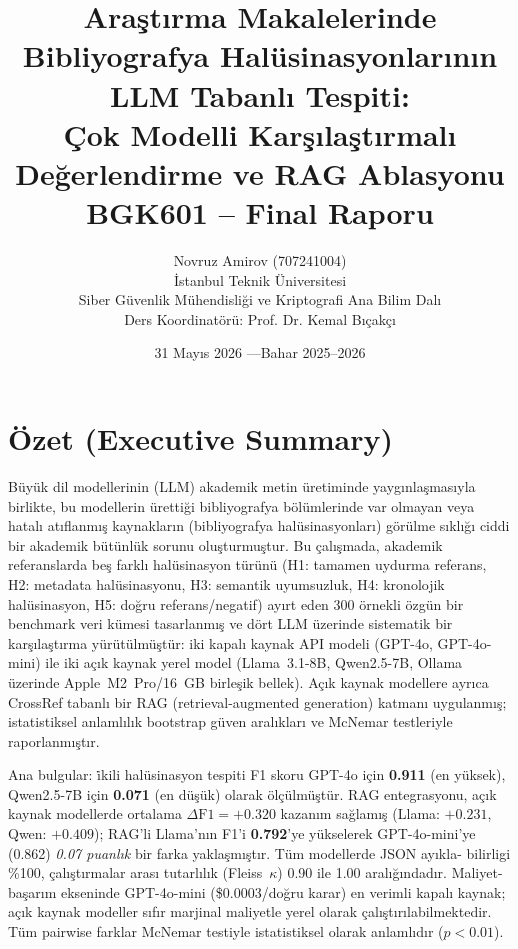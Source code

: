\documentclass[11pt,a4paper]{article}
\title{\textbf{Araştırma Makalelerinde Bibliyografya
       Halüsinasyonlarının LLM Tabanlı Tespiti:\\
       Çok Modelli Karşılaştırmalı Değerlendirme ve RAG Ablasyonu}\\[0.6em]
       \large BGK601 -- Final Raporu}
\author{Novruz Amirov (707241004)\\
        İstanbul Teknik Üniversitesi\\
        Siber Güvenlik Mühendisliği ve Kriptografi Ana Bilim Dalı\\
        Ders Koordinatörü: Prof. Dr. Kemal Bıçakçı}
\date{31 Mayıs 2026 \quad ---\quad Bahar 2025--2026}
\begin{document}
\maketitle
\thispagestyle{empty}

\begin{center}\small
{}
\end{center}

\section*{Özet (Executive Summary)}
Büyük dil modellerinin (LLM) akademik metin üretiminde yaygınlaşmasıyla
birlikte, bu modellerin ürettiği bibliyografya bölümlerinde var olmayan veya
hatalı atıflanmış kaynakların (bibliyografya halüsinasyonları) görülme sıklığı
ciddi bir akademik bütünlük sorunu oluşturmuştur. Bu çalışmada, akademik
referanslarda beş farklı halüsinasyon türünü (H1: tamamen uydurma referans,
H2: metadata halüsinasyonu, H3: semantik uyumsuzluk, H4: kronolojik
halüsinasyon, H5: doğru referans/negatif) ayırt eden 300 örnekli özgün bir
benchmark veri kümesi tasarlanmış ve dört LLM üzerinde sistematik bir
karşılaştırma yürütülmüştür: iki kapalı kaynak API modeli (GPT-4o,
GPT-4o-mini) ile iki açık kaynak yerel model (Llama~3.1-8B, Qwen2.5-7B,
Ollama üzerinde Apple~M2~Pro/16~GB birleşik bellek). Açık kaynak modellere
ayrıca CrossRef tabanlı bir RAG (retrieval-augmented generation) katmanı
uygulanmış; istatistiksel anlamlılık bootstrap güven aralıkları ve McNemar
testleriyle raporlanmıştır.

Ana bulgular: i̇kili halüsinasyon tespiti F1 skoru GPT-4o için
\textbf{0.911} (en yüksek), Qwen2.5-7B için \textbf{0.071} (en düşük) olarak
ölçülmüştür. RAG entegrasyonu, açık kaynak modellerde ortalama
$\Delta\text{F1}=+0.320$ kazanım sağlamış (Llama: $+0.231$, Qwen: $+0.409$);
RAG'li Llama'nın F1'i \textbf{0.792}'ye yükselerek GPT-4o-mini'ye (0.862)
\emph{0.07 puanlık} bir farka yaklaşmıştır. Tüm modellerde JSON ayıkla-
bilirligi \%100, çalıştırmalar arası tutarlılık (Fleiss~$\kappa$) 0.90 ile
1.00 aralığındadır. Maliyet-başarım ekseninde GPT-4o-mini
(\$0.0003/doğru karar) en verimli kapalı kaynak; açık kaynak modeller sıfır
marjinal maliyetle yerel olarak çalıştırılabilmektedir. Tüm pairwise farklar
McNemar testiyle istatistiksel olarak anlamlıdır ($p < 0.01$).
\end{document}

